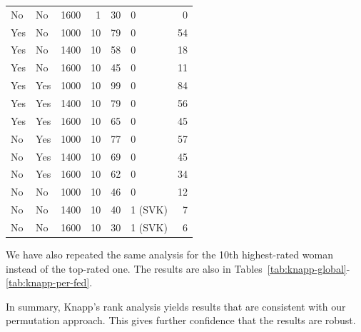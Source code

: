 \documentclass[9pt,twoside,lineno]{pnas-new}
\begin{document}
\begin{table}[!ht]
\begin{tabular}[t]{llrrrlr}
No & No & 1600 & 1 & 30 & 0 & 0\\
\addlinespace
Yes & No & 1000 & 10 & 79 & 0 & 54\\
Yes & No & 1400 & 10 & 58 & 0 & 18\\
Yes & No & 1600 & 10 & 45 & 0 & 11\\
Yes & Yes & 1000 & 10 & 99 & 0 & 84\\
Yes & Yes & 1400 & 10 & 79 & 0 & 56\\
Yes & Yes & 1600 & 10 & 65 & 0 & 45\\
No & Yes & 1000 & 10 & 77 & 0 & 57\\
No & Yes & 1400 & 10 & 69 & 0 & 45\\
No & Yes & 1600 & 10 & 62 & 0 & 34\\
No & No & 1000 & 10 & 46 & 0 & 12\\
No & No & 1400 & 10 & 40 & 1 (SVK) & 7\\
No & No & 1600 & 10 & 30 & 1 (SVK) & 6\\
\bottomrule
\end{tabular}
\end{table}

We have also repeated the same analysis for the 10th highest-rated woman instead of the top-rated one. The results are also in Tables~\ref{tab:knapp-global}-\ref{tab:knapp-per-fed}.

In summary, Knapp's rank analysis yields results that are consistent with our permutation approach. This gives further confidence that the results are robust.

\end{document}
